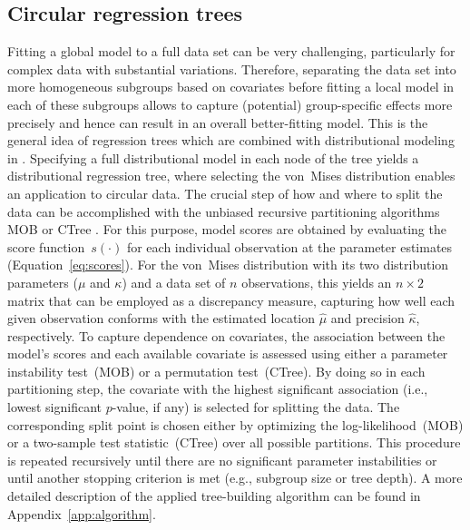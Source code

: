 \documentclass[nojss,shortnames]{jss}
\numberwithin{equation}{section}
\begin{document}
\subsection{Circular regression trees}
\label{sec:circtree}
Fitting a global model to a full data set can be very challenging, particularly
for complex data with substantial variations. Therefore, separating the data
set into more homogeneous subgroups based on covariates before fitting a local
model in each of these subgroups allows to capture (potential) group-specific
effects more precisely and hence can result in an overall better-fitting model.
This is the general idea of regression trees which are combined with
distributional modeling in \cite{Schlosser+Hothorn+Stauffer:2019}. Specifying a
full distributional model in each node of the tree yields a distributional
regression tree, where selecting the von~Mises distribution enables an
application to circular data. The crucial step of how and where to split the
data can be accomplished with the unbiased recursive partitioning algorithms
MOB \citep{Zeileis+Hothorn+Hornik:2008} or CTree
\citep{Hothorn+Hornik+Zeileis:2006}. For this purpose, model scores are
obtained by evaluating the score function~$s(\cdot)$ for each individual
observation at the parameter estimates (Equation~\ref{eq:scores}). For the
von~Mises distribution with its two distribution parameters ($\mu$ and
$\kappa$) and a data set of $n$ observations, this yields an $n \times 2$
matrix that can be employed as a discrepancy measure, capturing how well each
given observation conforms with the estimated location $\hat{\mu}$ and
precision $\hat{\kappa}$, respectively. To capture dependence on covariates,
the association between the model's scores and each available covariate is
assessed using either a parameter instability test~(MOB) or a permutation
test~(CTree). By doing so in each partitioning step, the covariate with the
highest significant association (i.e., lowest significant $p$-value, if any) is
selected for splitting the data. The corresponding split point is chosen either
by optimizing the log-likelihood~(MOB) or a two-sample test statistic~(CTree)
over all possible partitions. This procedure is repeated recursively until
there are no significant parameter instabilities or until another stopping
criterion is met (e.g., subgroup size or tree depth). A more detailed
description of the applied tree-building algorithm can be found in
Appendix~\ref{app:algorithm}.
\end{document}
